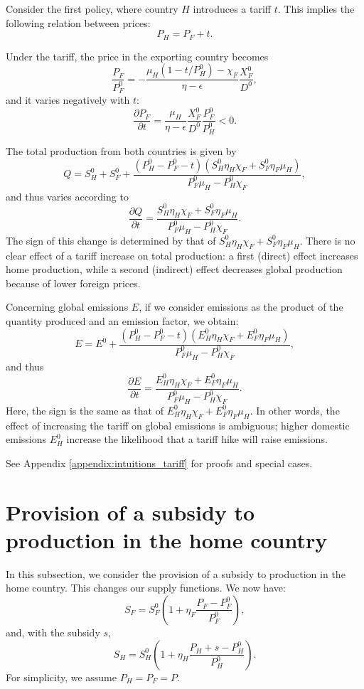 Consider the first policy, where country $H$ introduces a tariff $t$. This implies the following relation between prices: 
$$
P_H = P_F + t.
$$

Under the tariff, the price in the exporting country becomes
$$
\frac{P_F}{P_F^0} = -\frac{\mu_H (1 - t/P_H^0) - \chi_F}{\eta - \epsilon}\frac{X_F^0}{D^0},
$$
and it varies negatively with $t$: 
$$
\frac{\partial P_F}{\partial t} = \frac{\mu_H}{\eta - \epsilon} \frac{X_F^0}{D^0} \frac{P_F^0}{P_H^0} < 0.
$$

The total production from both countries is given by 
$$
Q = S_H^0 + S_F^0 + \frac{(P_H^0 - P_F^0 - t)(S_H^0 \eta_H \chi_F + S_F^0 \eta_F \mu_H)}{P_F^0 \mu_H - P_H^0 \chi_F},
$$
and thus varies according to 
$$
\frac{\partial Q}{\partial t} = \frac{S_H^0 \eta_H \chi_F + S_F^0 \eta_F \mu_H}{P_F^0 \mu_H - P_H^0 \chi_F}.
$$
The sign of this change is determined by that of $S_H^0 \eta_H \chi_F + S_F^0 \eta_F \mu_H$. There is no clear effect of a tariff increase on total production: a first (direct) effect increases home production, while a second (indirect) effect decreases global production because of lower foreign prices.

Concerning global emissions $E$, if we consider emissions as the product of the quantity produced and an emission factor, we obtain:
$$
E = E^0 + \frac{(P_H^0 - P_F^0 - t)(E_H^0 \eta_H \chi_F + E_F^0 \eta_F \mu_H)}{P_F^0 \mu_H - P_H^0 \chi_F},
$$
and thus
$$
\frac{\partial E}{\partial t} = \frac{E_H^0 \eta_H \chi_F + E_F^0 \eta_F \mu_H}{P_F^0 \mu_H - P_H^0 \chi_F}.
$$
Here, the sign is the same as that of $E_H^0 \eta_H \chi_F + E_F^0 \eta_F \mu_H$. In other words, the effect of increasing the tariff on global emissions is ambiguous; higher domestic emissions $E_H^0$ increase the likelihood that a tariff hike will raise emissions.

See Appendix \ref{appendix:intuitions_tariff} for proofs and special cases.

\section{Provision of a subsidy to production in the home country}\label{Sec_subvention}

In this subsection, we consider the provision of a subsidy to production in the home country. This changes our supply functions. We now have:
$$
S_F = S_F^0\left(1 + \eta_F\frac{P_F - P_F^0}{P_F^0}\right),
$$
and, with the subsidy $s$,
$$
S_H = S_H^0\left(1 + \eta_H\frac{P_H + s - P_H^0}{P_H^0}\right).
$$
For simplicity, we assume $P_H = P_F = P$.

